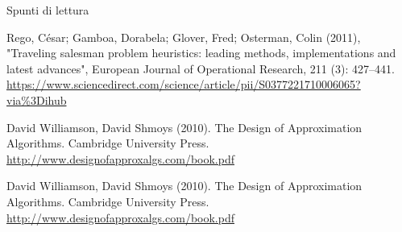 \begin{frame}{Spunti di lettura}

\begin{myboxtitle}[Bibliografia]
\BIL
\item Rego, César; Gamboa, Dorabela; Glover, Fred; Osterman, Colin (2011), "Traveling salesman problem heuristics: leading methods, implementations and latest advances", European Journal of Operational Research, 211 (3): 427–441.
\url{https://www.sciencedirect.com/science/article/pii/S0377221710006065?via\%3Dihub}

\item David Williamson, David Shmoys (2010). The Design of Approximation Algorithms. Cambridge University Press.\\
\url{http://www.designofapproxalgs.com/book.pdf}

\item David Williamson, David Shmoys (2010). The Design of Approximation Algorithms. Cambridge University Press.\\
\url{http://www.designofapproxalgs.com/book.pdf}
\EIL
\end{myboxtitle}


\end{frame}









\begin{frame}{}

\end{frame}




